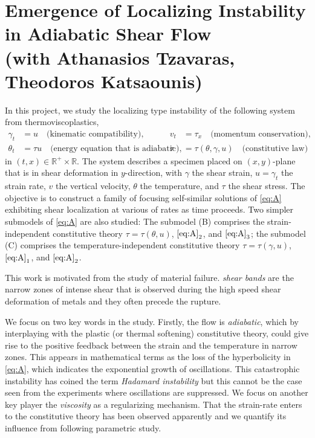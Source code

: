 \documentclass[a4paper,11pt]{article}
\begin{document}
\section{Emergence of Localizing Instability in Adiabatic Shear Flow \\{\small(with Athanasios Tzavaras, Theodoros Katsaounis)}}
In this project, we study the {localizing} type instability of the following system from thermoviscoplastics,
\begin{equation} \label{eq:A}\tag{A}
\begin{aligned}
 \gamma_t &= u \quad \text{(kinematic compatibility)}, 	&
 v_t &= \tau_x \quad \text{(momentum conservation)}, 	\\
 \theta_t &= \tau u \quad \text{(energy equation that is adiabatic)},	&
 \tau &=\tau(\theta,\gamma,u) \quad \text{(constitutive law)}			
\end{aligned}
\end{equation}
in $(t,x)\in \mathbb{R}^+\times \mathbb{R}$. The system describes a specimen placed on $(x,y)$-plane that is in shear deformation in $y$-direction, with $\gamma$ the shear strain, $u=\gamma_t$ the strain rate, $v$ the vertical velocity, $\theta$ the temperature, and $\tau$ the shear stress. The objective is to construct a family of focusing self-similar solutions of \eqref{eq:A} exhibiting shear localization at various of rates as time proceeds. Two simpler submodels of \eqref{eq:A} are also studied: The submodel (B) comprises the strain-independent constitutive theory $\tau = \tau(\theta,u)$, $\eqref{eq:A}_2$, and $\eqref{eq:A}_3$; the submodel (C) comprises the temperature-independent constitutive theory $\tau = \tau(\gamma,u)$, $\eqref{eq:A}_1$, and $\eqref{eq:A}_2$. 

This work is motivated from the study of material failure. {\it shear bands} are the narrow zones of intense shear that is observed during the high speed shear deformation of metals and they often precede the rupture. 

We focus on two key words in the study. Firstly, the flow is {\it adiabatic}, which by interplaying with the {plastic (or thermal softening)} constitutive theory, could give rise to the positive feedback between the strain and the temperature in narrow zones. This appears in mathematical terms as the loss of the hyperbolicity in \eqref{eq:A}, which indicates the exponential growth of oscillations. This catastrophic instability has coined the term {\it Hadamard instability} but this cannot be the case seen from the experiments where oscillations are suppressed. We focus on another key player the {\it viscosity} as a regularizing mechanism. That the strain-rate enters to the constitutive theory has been observed apparently and we quantify its influence from following parametric study.
\end{document}
